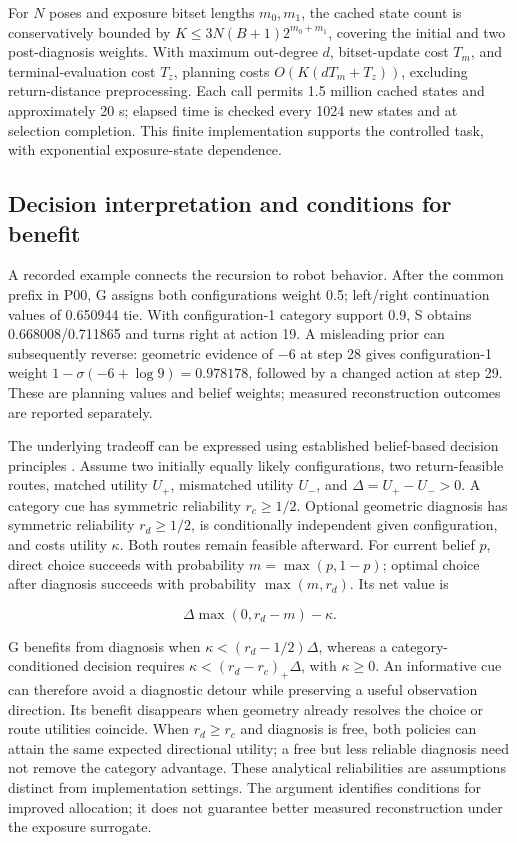 \documentclass[pdflatex,sn-mathphys-num]{sn-jnl}
\begin{document}
For \(N\) poses and exposure bitset lengths \(m_0,m_1\), the cached state count is conservatively bounded by \(K\le3N(B+1)2^{m_0+m_1}\), covering the initial and two post-diagnosis weights. With maximum out-degree \(d\), bitset-update cost \(T_m\), and terminal-evaluation cost \(T_z\), planning costs \(O(K(dT_m+T_z))\), excluding return-distance preprocessing. Each call permits 1.5 million cached states and approximately 20 s; elapsed time is checked every 1024 new states and at selection completion. This finite implementation supports the controlled task, with exponential exposure-state dependence.

\hypertarget{decision-interpretation-and-conditions-for-benefit}{%
\subsection{Decision interpretation and conditions for benefit}\label{decision-interpretation-and-conditions-for-benefit}}

A recorded example connects the recursion to robot behavior. After the common prefix in P00, G assigns both configurations weight 0.5; left/right continuation values of 0.650944 tie. With configuration-1 category support 0.9, S obtains 0.668008/0.711865 and turns right at action 19. A misleading prior can subsequently reverse: geometric evidence of \(-6\) at step 28 gives configuration-1 weight \(1-\sigma(-6+\log9)=0.978178\), followed by a changed action at step 29. These are planning values and belief weights; measured reconstruction outcomes are reported separately.

The underlying tradeoff can be expressed using established belief-based decision principles \cite{ref12,ref13}. Assume two initially equally likely configurations, two return-feasible routes, matched utility \(U_+\), mismatched utility \(U_-\), and \(\Delta=U_+-U_->0\). A category cue has symmetric reliability \(r_c\ge1/2\). Optional geometric diagnosis has symmetric reliability \(r_d\ge1/2\), is conditionally independent given configuration, and costs utility \(\kappa\). Both routes remain feasible afterward. For current belief \(p\), direct choice succeeds with probability \(m=\max(p,1-p)\); optimal choice after diagnosis succeeds with probability \(\max(m,r_d)\). Its net value is

\[
\Delta\max(0,r_d-m)-\kappa.
\]

G benefits from diagnosis when \(\kappa<(r_d-1/2)\Delta\), whereas a category-conditioned decision requires \(\kappa<(r_d-r_c)_+\Delta\), with \(\kappa\ge0\). An informative cue can therefore avoid a diagnostic detour while preserving a useful observation direction. Its benefit disappears when geometry already resolves the choice or route utilities coincide. When \(r_d\ge r_c\) and diagnosis is free, both policies can attain the same expected directional utility; a free but less reliable diagnosis need not remove the category advantage. These analytical reliabilities are assumptions distinct from implementation settings. The argument identifies conditions for improved allocation; it does not guarantee better measured reconstruction under the exposure surrogate.
\end{document}
